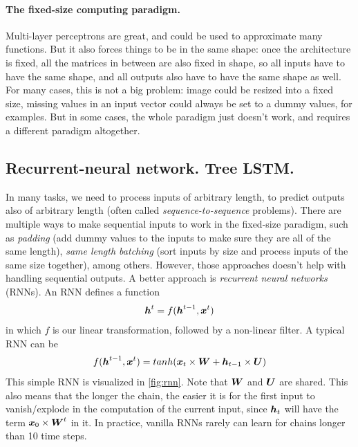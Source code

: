 \paragraph{The fixed-size computing paradigm.} Multi-layer perceptrons are
great, and could be used to approximate many functions. But it also forces
things to be in the same shape: once the architecture is fixed, all the matrices
in between are also fixed in shape, so all inputs have to have the same shape,
and all outputs also have to have the same shape as well. For many cases, this
is not a big problem: image could be resized into a fixed size, missing
values in an input vector could always be set to a dummy values, for examples.
But in some cases, the whole paradigm just doesn't work, and requires a
different paradigm altogether. 


\subsection{Recurrent-neural network. Tree LSTM.}
In many tasks, we need to process inputs of arbitrary length, to predict outputs also of arbitrary length (often called \emph{sequence-to-sequence} problems). There are multiple ways to make sequential inputs to work in the fixed-size paradigm, such as \emph{padding} (add dummy values to the inputs to make sure they are all of the same length), \emph{same length batching} (sort inputs by size and process inputs of the same size together), among others. However, those approaches doesn't help with handling sequential outputs. A better approach is \emph{recurrent neural networks} (RNNs). An RNN defines a function
\begin{align}
\boldsymbol{h}^t = f(\boldsymbol{h}^{t-1}, \boldsymbol{x}^{t})
\end{align}
in which $f$ is our linear transformation, followed by a non-linear filter. A
typical RNN can be
\begin{align}
  f(\boldsymbol{h}^{t-1}, \boldsymbol{x}^t) = tanh(\boldsymbol{x}_t \times \boldsymbol{W} + \boldsymbol{h}_{t-1} \times \boldsymbol{U} )
\end{align}
This simple RNN is visualized in \cref{fig:rnn}. Note that $\boldsymbol{W}$ and
$\boldsymbol{U}$ are shared. This also means that the longer the chain, the easier it
is for the first input to vanish/explode in the computation of the current
input, since $\boldsymbol{h}_t$ will have the term $\boldsymbol{x}_0\times\boldsymbol{W}^t$ in it.
In practice, vanilla RNNs rarely can learn for chains longer than 10 time steps.

